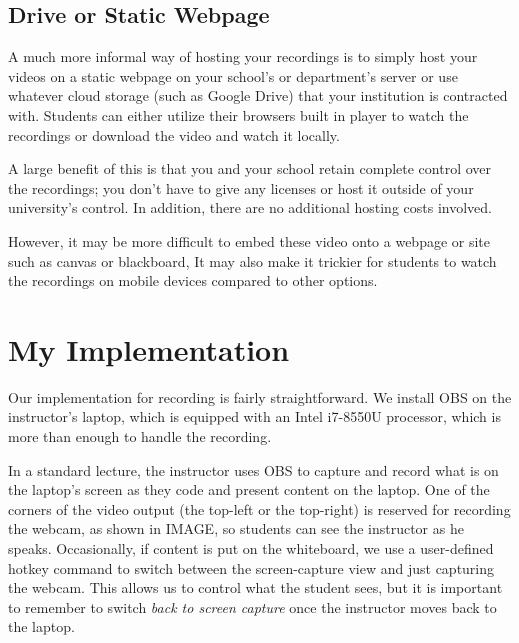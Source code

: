 \documentclass[sigconf]{acmart}
\begin{document}
\subsection{Drive or Static Webpage}
A much more informal way of hosting your recordings is to simply host your videos on a static webpage on your school's or department's server or use whatever cloud storage (such as Google Drive) that your institution is contracted with.
Students can either utilize their browsers built in player to watch the recordings or download the video and watch it locally.

A large benefit of this is that you and your school retain complete control over the recordings; you don't have to give any licenses or host it outside of your university's control.
In addition, there are no additional hosting costs involved.

However, it may be more difficult to embed these video onto a webpage or site such as canvas or blackboard, 
It may also make it trickier for students to watch the recordings on mobile devices compared to other options.


%
%
%


\section{My Implementation}
\label{implementation}

Our implementation for recording is fairly straightforward.
We install OBS \cite{bailey2017open} on the instructor's laptop, which is equipped with an Intel i7-8550U processor, which is more than enough to handle the recording.

In a standard lecture, the instructor uses OBS to capture and record what is on the laptop's screen as they code and present content on the laptop.
One of the corners of the video output (the top-left or the top-right) is reserved for recording the webcam, as shown in IMAGE, so students can see the instructor as he speaks.
Occasionally, if content is put on the whiteboard, we use a user-defined hotkey command to switch between the screen-capture view and just capturing the webcam.
This allows us to control what the student sees, but it is important to remember to switch \textit{back to screen capture} once the instructor moves back to the laptop.  
\end{document}
